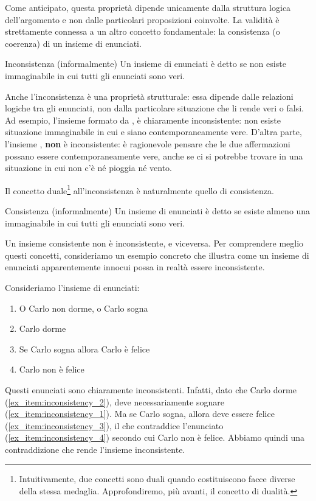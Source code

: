 Come anticipato, questa proprietà dipende unicamente dalla struttura logica dell'argomento e non dalle particolari proposizioni coinvolte.
La validità è strettamente connessa a un altro concetto fondamentale: la consistenza (o coerenza) di un insieme di enunciati.

\begin{definition}{Inconsistenza (informalmente)}
  Un insieme di enunciati è detto  se non esiste  immaginabile in cui tutti gli enunciati sono veri.
\end{definition}

Anche l'inconsistenza è una proprietà strutturale: essa dipende dalle relazioni logiche tra gli enunciati, non dalla particolare situazione che li rende veri o falsi.
Ad esempio, l'insieme formato da ,  è chiaramente inconsistente: non esiste situazione immaginabile in cui  e  siano contemporaneamente vere.
D'altra parte, l'insieme ,  \textbf{non} è inconsistente: è ragionevole pensare che le due affermazioni possano essere contemporaneamente vere, anche se ci si potrebbe trovare in una situazione in cui non c'è né pioggia né vento.

Il concetto duale\footnote{Intuitivamente, due concetti sono duali quando costituiscono facce diverse della stessa medaglia. Approfondiremo, più avanti, il concetto di dualità.} all'inconsistenza è naturalmente quello di consistenza.

\begin{definition}{Consistenza (informalmente)}
  Un insieme di enunciati è detto  se esiste almeno una  immaginabile in cui tutti gli enunciati sono veri.
\end{definition}

Un insieme consistente non è inconsistente, e viceversa.
Per comprendere meglio questi concetti, consideriamo un esempio concreto che illustra come un insieme di enunciati apparentemente innocui possa in realtà essere inconsistente.

\begin{example}{}
  Consideriamo l'insieme di enunciati:
  \begin{enumerate}
    \item O Carlo non dorme, o Carlo sogna\label{ex_item:inconsistency_1}
    \item Carlo dorme\label{ex_item:inconsistency_2}
    \item Se Carlo sogna allora Carlo è felice\label{ex_item:inconsistency_3}
    \item Carlo non è felice\label{ex_item:inconsistency_4}
  \end{enumerate}

  Questi enunciati sono chiaramente inconsistenti. Infatti, dato che Carlo dorme (\ref{ex_item:inconsistency_2}), deve necessariamente sognare (\ref{ex_item:inconsistency_1}). 
  Ma se Carlo sogna, allora deve essere felice (\ref{ex_item:inconsistency_3}), il che contraddice l'enunciato (\ref{ex_item:inconsistency_4}) secondo cui Carlo non è felice.
  Abbiamo quindi una contraddizione che rende l'insieme inconsistente.
\end{example}

